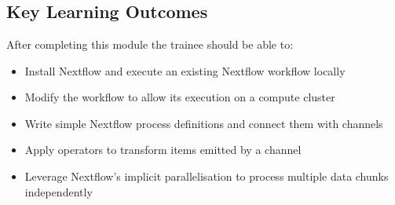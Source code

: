 
\chapter{\moduleTitle}
\newpage


%
\section{Key Learning Outcomes}

After completing this module the trainee should be able to:
\begin{itemize}
  \item Install Nextflow and execute an existing Nextflow workflow locally
  \item Modify the workflow to allow its execution on a compute cluster
  \item Write simple Nextflow process definitions and connect them with channels
  \item Apply operators to transform items emitted by a channel
  \item Leverage Nextflow's implicit parallelisation to process multiple data chunks independently
\end{itemize}


